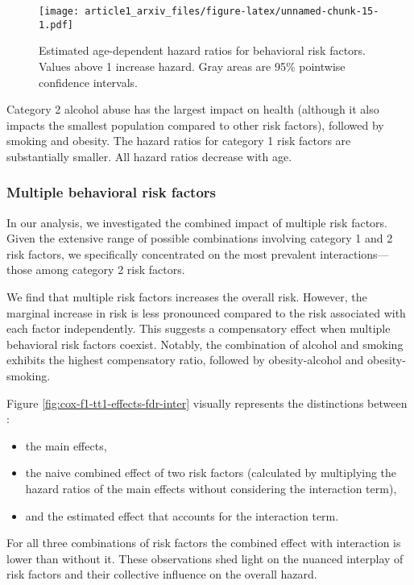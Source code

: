 \documentclass{article}
\providecommand{\tightlist}{%
  \setlength{\itemsep}{0pt}\setlength{\parskip}{0pt}}
\begin{document}
\begin{figure}
\centering
\texttt{[image: article1\_arxiv\_files/figure-latex/unnamed-chunk-15-1.pdf]}
\caption{\label{fig:cox_f1_tt1_effects_fdr} Estimated age-dependent
hazard ratios for behavioral risk factors. Values above 1 increase
hazard. Gray areas are 95\% pointwise confidence intervals.}
\end{figure}

Category 2 alcohol abuse has the largest impact on health (although it
also impacts the smallest population compared to other risk factors),
followed by smoking and obesity. The hazard ratios for category 1 risk
factors are substantially smaller. All hazard ratios decrease with age.

\hypertarget{multiple-behavioral-risk-factors}{%
\subsubsection{Multiple behavioral risk
factors}\label{multiple-behavioral-risk-factors}}

In our analysis, we investigated the combined impact of multiple risk
factors. Given the extensive range of possible combinations involving
category 1 and 2 risk factors, we specifically concentrated on the most
prevalent interactions---those among category 2 risk factors.

We find that multiple risk factors increases the overall risk. However,
the marginal increase in risk is less pronounced compared to the risk
associated with each factor independently. This suggests a compensatory
effect when multiple behavioral risk factors coexist. Notably, the
combination of alcohol and smoking exhibits the highest compensatory
ratio, followed by obesity-alcohol and obesity-smoking.

Figure \ref{fig:cox-f1-tt1-effects-fdr-inter} visually represents the
distinctions between :

\begin{itemize}
\tightlist
\item
  the main effects,
\item
  the naive combined effect of two risk factors (calculated by
  multiplying the hazard ratios of the main effects without considering
  the interaction term),
\item
  and the estimated effect that accounts for the interaction term.
\end{itemize}

For all three combinations of risk factors the combined effect with
interaction is lower than without it. These observations shed light on
the nuanced interplay of risk factors and their collective influence on
the overall hazard.
\end{document}
